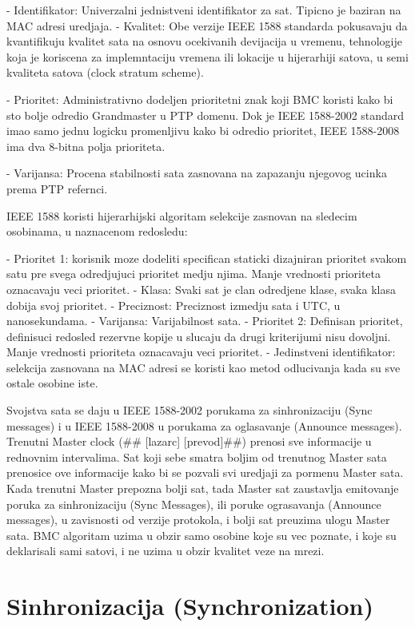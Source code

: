 \documentclass[a4paper,12pt, master]{etf}
\begin{document}
	- Identifikator: Univerzalni jednistveni identifikator za sat. Tipicno je baziran na MAC 
	adresi uredjaja.
	- Kvalitet: Obe verzije IEEE 1588 standarda pokusavaju da kvantifikuju kvalitet sata na 
	osnovu ocekivanih devijacija u vremenu, tehnologije koja je koriscena za implemntaciju 
	vremena ili lokacije u hijerarhiji satova, u semi kvaliteta satova (clock stratum scheme).

	- Prioritet: Administrativno dodeljen prioritetni znak koji BMC koristi kako bi sto bolje
	odredio Grandmaster u PTP domenu. Dok je IEEE 1588-2002 standard imao samo jednu logicku
	promenljivu kako bi odredio prioritet, IEEE 1588-2008 ima dva 8-bitna polja prioriteta.

	- Varijansa: Procena stabilnosti sata zasnovana na zapazanju njegovog ucinka prema PTP 
	refernci.

	IEEE 1588 koristi hijerarhijski algoritam selekcije zasnovan na sledecim osobinama, u
	naznacenom redosledu:

	- Prioritet 1: korisnik moze dodeliti specifican staticki dizajniran prioritet svakom satu 
	pre	svega odredjujuci prioritet medju njima. Manje vrednosti prioriteta oznacavaju veci 
	prioritet.
	- Klasa: Svaki sat je clan odredjene klase, svaka klasa dobija svoj prioritet.
	- Preciznost: Preciznost izmedju sata i UTC, u nanosekundama.
	- Varijansa: Varijabilnost sata.
	- Prioritet 2: Definisan prioritet, definisuci redosled rezervne kopije u slucaju da drugi
	kriterijumi nisu dovoljni. Manje vrednosti prioriteta oznacavaju veci prioritet.
	- Jedinstveni identifikator: selekcija zasnovana na MAC adresi se koristi kao metod 
	odlucivanja	kada su sve ostale osobine iste.

	Svojstva sata se daju u IEEE 1588-2002 porukama za sinhronizaciju (Sync messages) i u IEEE
	1588-2008 u porukama za oglasavanje (Announce messages). Trenutni Master clock (\#\#
	[lazarc] [prevod]\#\#) prenosi sve informacije u rednovnim intervalima. Sat koji sebe 
	smatra boljim od trenutnog Master sata prenosice ove informacije kako bi se pozvali svi 
	uredjaji za pormenu	Master sata. Kada trenutni Master prepozna bolji sat, tada Master sat 
	zaustavlja emitovanje poruka za sinhronizaciju (Sync Messages), ili poruke ograsavanja 
	(Announce messages), u zavisnosti od verzije protokola, i bolji sat preuzima ulogu Master 
	sata. BMC algoritam uzima u obzir samo osobine koje su vec poznate, i koje su deklarisali 
	sami satovi, i ne uzima u obzir	kvalitet veze na mrezi.

	\section{Sinhronizacija (Synchronization)}
\end{document}
